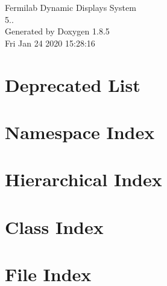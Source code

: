 \documentclass[twoside]{book}
\newcommand{\clearemptydoublepage}{%
  \newpage{\pagestyle{empty}\cleardoublepage}%
}
\begin{document}
\hypersetup{pageanchor=false}
\begin{titlepage}
\vspace*{7cm}
\begin{center}%
{\Large Fermilab Dynamic Displays System \\[1ex]\large 5.. }\\
\vspace*{1cm}
{\large Generated by Doxygen 1.8.5}\\
\vspace*{0.5cm}
{\small Fri Jan 24 2020 15:28:16}\\
\end{center}
\end{titlepage}
\clearemptydoublepage
\tableofcontents
\clearemptydoublepage
{}
\hypersetup{pageanchor=true}

\chapter{Deprecated List}
\label{deprecated}
\hypertarget{deprecated}{}

\chapter{Namespace Index}

\chapter{Hierarchical Index}

\chapter{Class Index}

\chapter{File Index}

\end{document}
